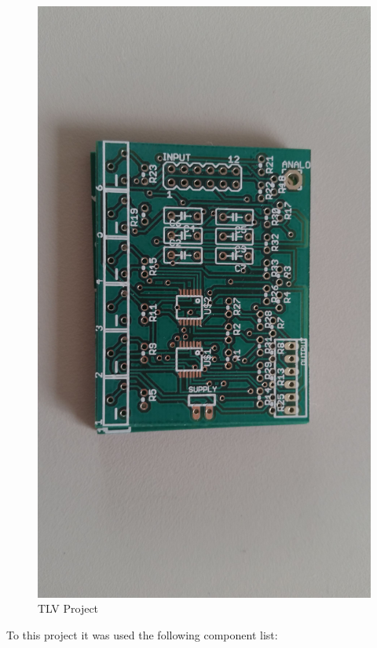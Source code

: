 \begin{figure}[!htpb]
\centering
\caption{TLV Project}
\label{TLV_board}
\includegraphics[scale=0.08]{images/TLV_board}
\end{figure}

To this project it was used the following component list:

